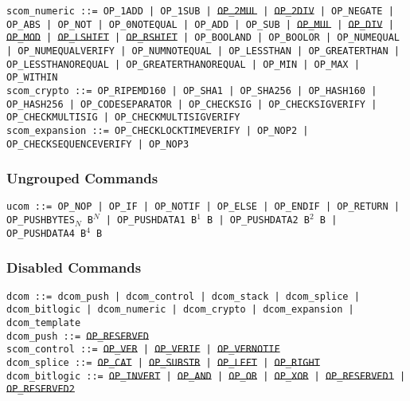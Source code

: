 \documentclass{article}
\begin{document}
\noindent \hangindent=0.7cm
\texttt{scom\_numeric ::=
  OP\_1ADD | OP\_1SUB | \sout{OP\_2MUL} | \sout{OP\_2DIV} | OP\_NEGATE |
  OP\_ABS | OP\_NOT | OP\_0NOTEQUAL | OP\_ADD | OP\_SUB | \sout{OP\_MUL} |
  \sout{OP\_DIV} | \sout{OP\_MOD} | \sout{OP\_LSHIFT} | \sout{OP\_RSHIFT} |
  OP\_BOOLAND | OP\_BOOLOR | OP\_NUMEQUAL | OP\_NUMEQUALVERIFY |
  OP\_NUMNOTEQUAL | OP\_LESSTHAN | OP\_GREATERTHAN | OP\_LESSTHANOREQUAL |
  OP\_GREATERTHANOREQUAL | OP\_MIN | OP\_MAX | OP\_WITHIN} \\

\noindent \hangindent=0.7cm
\texttt{scom\_crypto ::=
  OP\_RIPEMD160 | OP\_SHA1 | OP\_SHA256 | OP\_HASH160 | OP\_HASH256 |
  OP\_CODESEPARATOR | OP\_CHECKSIG | OP\_CHECKSIGVERIFY | OP\_CHECKMULTISIG |
  OP\_CHECKMULTISIGVERIFY} \\

\noindent \hangindent=0.7cm
\texttt{scom\_expansion ::=
  OP\_CHECKLOCKTIMEVERIFY | OP\_NOP2 |
  OP\_CHECKSEQUENCEVERIFY | OP\_NOP3 } \\

\subsubsection{Ungrouped Commands}
\noindent \hangindent=0.7cm
\texttt{ucom ::= OP\_NOP | OP\_IF | OP\_NOTIF | OP\_ELSE | OP\_ENDIF | OP\_RETURN
  | OP\_PUSHBYTES$_N$ B$^N$ | OP\_PUSHDATA1 B$^1$ B | OP\_PUSHDATA2 B$^2$ B
  | OP\_PUSHDATA4 B$^4$ B}

\subsubsection{Disabled Commands}
\noindent \hangindent=0.7cm
\texttt{dcom ::=
  dcom\_push | dcom\_control | dcom\_stack | dcom\_splice | dcom\_bitlogic |
  dcom\_numeric | dcom\_crypto | dcom\_expansion | dcom\_template} \\

\noindent \hangindent=0.7cm
\texttt{dcom\_push ::= \sout{OP\_RESERVED}} \\

\noindent \hangindent=0.7cm
\texttt{scom\_control ::=
 \sout{OP\_VER} | \sout{OP\_VERIF} | \sout{OP\_VERNOTIF}} \\

\noindent \hangindent=0.7cm
\texttt{dcom\_splice ::=
  \sout{OP\_CAT }| \sout{OP\_SUBSTR} | \sout{OP\_LEFT} | \sout{OP\_RIGHT}
  } \\

\noindent \hangindent=0.7cm
\texttt{dcom\_bitlogic ::=
  \sout{OP\_INVERT} | \sout{OP\_AND} | \sout{OP\_OR} | \sout{OP\_XOR} |
  \sout{OP\_RESERVED1} | \sout{OP\_RESERVED2}} \\
\end{document}
